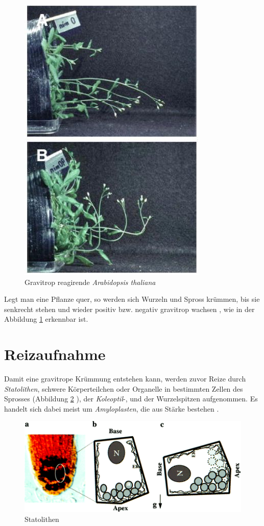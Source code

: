 \documentclass[
a4paper, 
11pt, 
ngerman,
listof=totoc,
bibliography=totocnumbered,
abstracton
]{scrreprt}
\begin{document}
\begin{figure}[H]
\centering 
 \includegraphics[width = 0.3\linewidth]{bilder/gravitrop_reagierende_Pflanze.jpg}
 \caption{Gravitrop reagirende \emph{Arabidopsis thaliana} \label{gravitrop_reagierende_Pflanze}}
\end{figure} 
 
Legt man eine Pflanze quer, so werden sich Wurzeln und Spross krümmen, bis sie senkrecht stehen und wieder positiv bzw. negativ gravitrop wachsen \parencite[528]{Luettge}, wie in der Abbildung \ref{gravitrop_reagierende_Pflanze} \parencite[5]{gravitrop_reagierende_Pflanze} erkennbar ist.







\section{Reizaufnahme}

Damit eine gravitrope Krümmung entstehen kann, werden zuvor Reize durch \emph{Statolithen}, schwere Körperteilchen oder Organelle in bestimmten Zellen des Sprosses (Abbildung \ref{Statolithen} \parencite[345]{Statolithen}), der \emph{Koleoptil}-, und der Wurzelspitzen aufgenommen. Es handelt sich dabei meist um \emph{Amyloplasten}, die aus Stärke bestehen \parencite[530]{Luettge}.

\begin{figure}[H]
	\centering 
	\includegraphics[width = 0.4\linewidth]{bilder/Statolithen2.png}
	\caption{Statolithen \label{Statolithen}}
\end{figure} 
\end{document}
